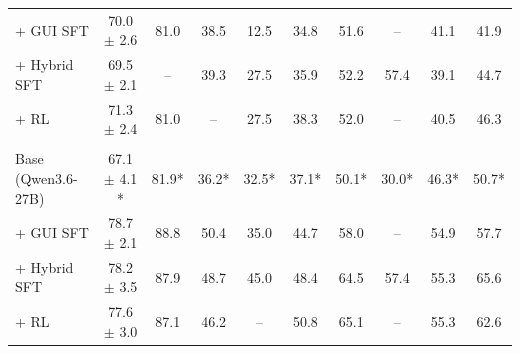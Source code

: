 \begin{table}[h]
{\begin{tabular}{lccccccccc}
\quad + GUI SFT
  & 70.0 $\pm$ 2.6 & 81.0
  & 38.5 & 12.5
  & 34.8 & 51.6
  & --
  & 41.1 & 41.9 \\
\quad + Hybrid SFT
  & 69.5 $\pm$ 2.1 & --
  & 39.3 & 27.5
  & 35.9 & 52.2
  & 57.4
  & 39.1 & 44.7 \\
\quad + RL
  & 71.3 $\pm$ 2.4 & 81.0
  & -- & 27.5
  & 38.3 & 52.0
  & --
  & 40.5 & 46.3 \\
\addlinespace
\multicolumn{10}{l}{\textit{27B Model}} \\[-2pt]
Base (Qwen3.6-27B)
  & 67.1 $\pm$ 4.1 *& 81.9*
  & 36.2* & 32.5*
  & 37.1* & 50.1*
  & 30.0*
  & 46.3* & 50.7* \\
\quad + GUI SFT
  & 78.7 $\pm$ 2.1 & 88.8
  & 50.4 & 35.0
  & 44.7 & 58.0
  & --
  & 54.9 & 57.7 \\
\quad + Hybrid SFT
  & 78.2 $\pm$ 3.5 & 87.9
  & 48.7 & 45.0
  & 48.4 & 64.5
  & 57.4
  & 55.3 & 65.6 \\
\quad + RL
  & 77.6 $\pm$ 3.0 & 87.1
  & 46.2 & --
  & 50.8 & 65.1
  & --
  & 55.3 & 62.6 \\
\bottomrule
\end{tabular}
}
\end{table}


